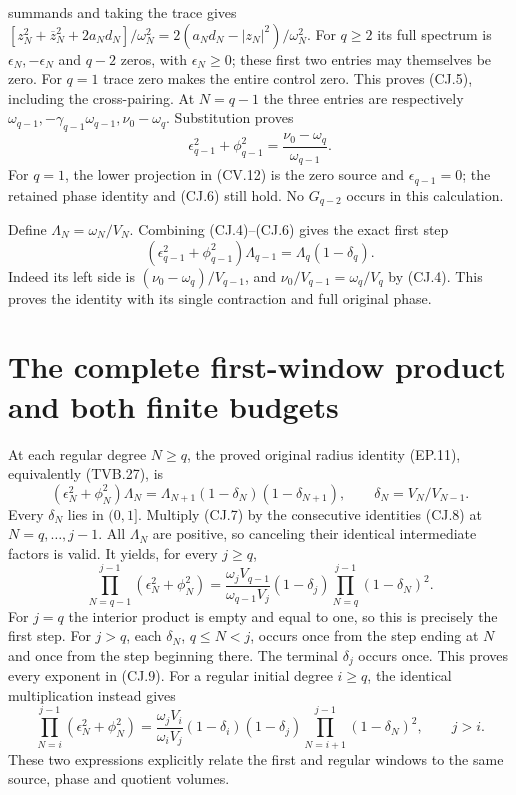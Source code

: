 \documentclass[11pt]{article}
\begin{document}
summands and taking the trace gives
$[z_N^2+\overline z_N^2+2a_Nd_N]/\omega_N^2
=2(a_Nd_N-|z_N|^2)/\omega_N^2$.
For $q\ge2$ its full spectrum is $\epsilon_N,-\epsilon_N$
and $q-2$ zeros, with $\epsilon_N\ge0$; these first two
entries may themselves be zero. For $q=1$ trace zero makes
the entire control zero. This proves (CJ.5), including the cross-pairing.
At $N=q-1$ the three entries are respectively
$\omega_{q-1},-\gamma_{q-1}\omega_{q-1},\nu_0-\omega_q$.
Substitution proves
\[
 \epsilon_{q-1}^2+\phi_{q-1}^2
 =\frac{\nu_0-\omega_q}{\omega_{q-1}}.
 \tag{CJ.6}
\]
For $q=1$, the lower projection in (CV.12) is the zero source
and $\epsilon_{q-1}=0$; the retained phase identity and (CJ.6)
still hold. No $G_{q-2}$ occurs in this calculation.

Define $\Lambda_N=\omega_N/V_N$. Combining (CJ.4)--(CJ.6)
gives the exact first step
\[
 (\epsilon_{q-1}^2+\phi_{q-1}^2)\Lambda_{q-1}
      =\Lambda_q(1-\delta_q).
 \tag{CJ.7}
\]
Indeed its left side is $(\nu_0-\omega_q)/V_{q-1}$, and
$\nu_0/V_{q-1}=\omega_q/V_q$ by (CJ.4). This proves the
identity with its single contraction and full original phase.

\section{The complete first-window product and both finite budgets}

At each regular degree $N\ge q$, the proved original radius
identity (EP.11), equivalently (TVB.27), is
\[
 (\epsilon_N^2+\phi_N^2)\Lambda_N
 =\Lambda_{N+1}(1-\delta_N)(1-\delta_{N+1}),
 \qquad \delta_N=V_N/V_{N-1}.
 \tag{CJ.8}
\]
Every $\delta_N$ lies in $(0,1]$. Multiply (CJ.7) by the
consecutive identities (CJ.8) at $N=q,\ldots,j-1$.
All $\Lambda_N$ are positive, so canceling their identical
intermediate factors is valid. It yields, for every $j\ge q$,
\[
 \boxed{
 \prod_{N=q-1}^{j-1}(\epsilon_N^2+\phi_N^2)
 =\frac{\omega_jV_{q-1}}{\omega_{q-1}V_j}
       (1-\delta_j)\prod_{N=q}^{j-1}(1-\delta_N)^2.}
 \tag{CJ.9}
\]
For $j=q$ the interior product is empty and equal to one,
so this is precisely the first step. For $j>q$, each
$\delta_N$, $q\le N<j$, occurs once from the step ending at
$N$ and once from the step beginning there. The terminal
$\delta_j$ occurs once. This proves every exponent in (CJ.9).
For a regular initial degree $i\ge q$, the identical multiplication
instead gives
\[
 \prod_{N=i}^{j-1}(\epsilon_N^2+\phi_N^2)
 =\frac{\omega_jV_i}{\omega_iV_j}
       (1-\delta_i)(1-\delta_j)
       \prod_{N=i+1}^{j-1}(1-\delta_N)^2,
 \qquad j>i.
 \tag{CJ.10}
\]
These two expressions explicitly relate the first and regular
windows to the same source, phase and quotient volumes.
\end{document}
